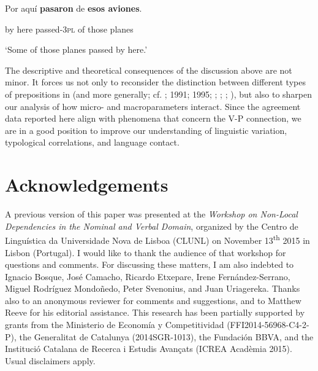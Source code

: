 \documentclass[output=paper]{langsci/langscibook}
\begin{document}
\begin{styleHTMLPreformatted}
Por  aquí   \textbf{pasaron}      de  \textbf{esos   aviones}. 
\end{styleHTMLPreformatted}

\begin{styleHTMLPreformatted}
           by    here  passed-\textsc{3pl}  of  those  planes
\end{styleHTMLPreformatted}

\begin{styleHTMLPreformatted}
           ‘Some of those planes passed by here.’
\end{styleHTMLPreformatted}

\begin{styleHTMLPreformatted}
The descriptive and theoretical consequences of the discussion above are not minor. It forces us not only to reconsider the distinction between different types of prepositions in  (and more generally; cf. \citealt{Demonte1987}; 1991; 1995; \citealt{Abels2003}; \citealt{Cuervo2003}; \citet{Pesetsky2004}; \citealt{Romero2011}), but also to sharpen our analysis of how micro- and macroparameters interact. Since the agreement data reported here align with phenomena that concern the V-P connection, we are in a good position to improve our understanding of linguistic variation, typological correlations, and language contact.
\end{styleHTMLPreformatted}

\section{ Acknowledgements}

\begin{styleHTMLPreformatted}
A previous version of this paper was presented at the \textit{Workshop on Non-Local Dependencies in the Nominal and Verbal Domain}, organized by the Centro de Linguística da Universidade Nova de Lisboa (CLUNL) on November 13\textsuperscript{th} 2015 in Lisbon (Portugal). I would like to thank the audience of that workshop for questions and comments. For discussing these matters, I am also indebted to Ignacio Bosque, José Camacho, Ricardo Etxepare, Irene Fernández-Serrano, Miguel Rodríguez Mondoñedo, Peter Svenonius, and Juan Uriagereka. Thanks also to an anonymous reviewer for comments and suggestions, and to Matthew Reeve for his editorial assistance. This research has been partially supported by grants from the Ministerio de Economía y Competitividad (FFI2014-56968-C4-2-P), the Generalitat de Catalunya (2014SGR-1013), the Fundación BBVA, and the Institució Catalana de Recerca i Estudis Avançats (ICREA Acadèmia 2015). Usual disclaimers apply.
\end{styleHTMLPreformatted}
\end{document}
